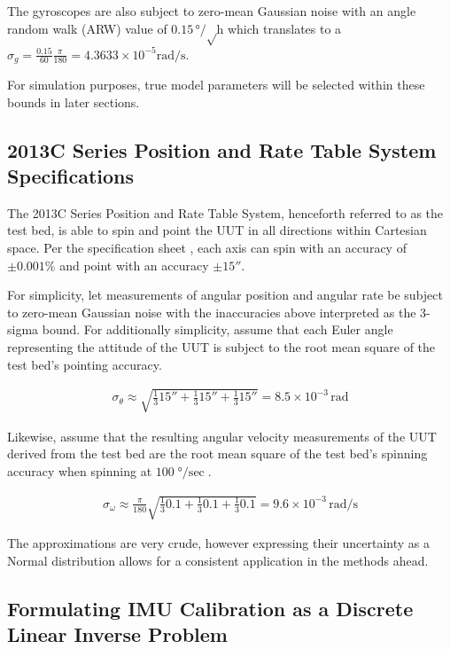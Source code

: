 The gyroscopes are also subject to zero-mean Gaussian noise with an angle random walk (ARW) value of $0.15 \unit{\degree\per\sqrt\hour}$ which translates to a $\sigma_g = \frac{0.15}{60}\frac{\pi}{180} = 4.3633 \times 10^{-5} \unit{\radian\per\second}$.

For simulation purposes, true model parameters will be selected within these bounds in later sections.


\subsection{2013C Series Position and Rate Table System Specifications}

The 2013C Series Position and Rate Table System, henceforth referred to as the test bed, is able to spin and point the UUT in all directions within Cartesian space. Per the specification sheet \cite{threeAxisRateTableTable}, each axis can spin with an accuracy of $\pm 0.001\%$ and point with an accuracy $\pm 15 \unit{\arcsecond}$.

For simplicity, let measurements of angular position and angular rate be subject to zero-mean Gaussian noise with the inaccuracies above interpreted as the 3-sigma bound. For additionally simplicity, assume that each Euler angle representing the attitude of the UUT is subject to the root mean square of the test bed's pointing accuracy.

\begin{align*}
	\sigma_\theta \approx \sqrt{\frac{1}{3} 15 \unit{\arcsecond} + \frac{1}{3} 15 \unit{\arcsecond} + \frac{1}{3} 15 \unit{\arcsecond}} = 8.5 \times 10^{-3} \,\unit{\radian}
\end{align*}

Likewise, assume that the resulting angular velocity measurements of the UUT derived from the test bed are the root mean square of the test bed's spinning accuracy when spinning at $100 \unit{\degree\per\sec}$.

\begin{align*}
	\sigma_\omega \approx \frac{\pi}{180} \sqrt{\frac{1}{3} 0.1 + \frac{1}{3} 0.1 + \frac{1}{3} 0.1} = 9.6 \times 10^{-3} \,\unit{\radian\per\second}
\end{align*}

The approximations are very crude, however expressing their uncertainty as a Normal distribution allows for a consistent application in the methods ahead.


\subsection{Formulating IMU Calibration as a Discrete Linear Inverse Problem}

